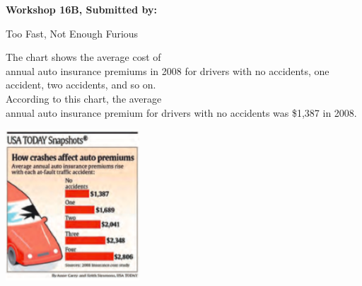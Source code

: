 \documentclass[11pt, chapterprefix=true]{scrbook}\usepackage[]{graphicx}\usepackage[]{color}
\begin{document}
\begin{exercises}
\begin{exercise}
\end{exercise}
\begin{solution}  %

\end{solution}

\clearpage

    \begin{exercise}  %

    \begin{center}
\begin{flushleft}\textbf{\large \hfill Workshop 16B, Submitted by: }\end{flushleft}

\end{center}

\begin{minipage}[ht]{7cm}

Too Fast, Not Enough Furious

The chart shows the average cost of \\ annual auto insurance premiums in 2008 for drivers with no accidents, one \\ accident, two accidents, and so on. \\ According to this chart, the average \\ annual auto insurance premium for drivers with no accidents was \$1,387 in 2008.

\end{minipage} \hfill 
\begin{minipage}[ht]{7cm}

\includegraphics[width=5cm]{chapters/Workshops/ext_figure/UsaToday.png} %


\end{minipage}
\end{exercise}
\end{exercises}
\end{document}
